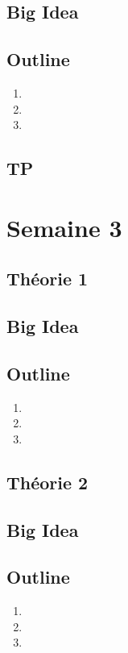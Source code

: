 \documentclass{article}
\begin{document}
\subsection*{Big Idea}
\subsection*{Outline}
    \begin{enumerate}
    \item
    \item
    \item
    \end{enumerate}
\subsection{TP}

\pagebreak
\section{Semaine 3}
\subsection{Théorie 1}
\subsection*{Big Idea}
\subsection*{Outline}
    \begin{enumerate}
    \item
    \item
    \item
    \end{enumerate}
\subsection{Théorie 2}
\subsection*{Big Idea}
\subsection*{Outline}
    \begin{enumerate}
    \item
    \item
    \item
    \end{enumerate}
\end{document}
